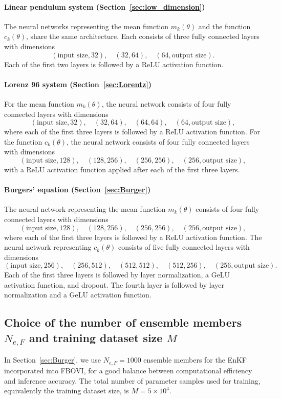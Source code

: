 \documentclass[preprint,3p,times]{elsarticle}
\begin{document}
\paragraph{Linear pendulum system (Section~\ref{sec:low_dimension})}
The neural networks representing the mean function $m_k(\theta)$ and the function $c_k(\theta)$, share the same architecture. Each consists of three fully connected layers with dimensions
\[
(\text{input size}, 32), \quad (32, 64), \quad (64, \text{output size}).
\]
Each of the first two layers is followed by a ReLU activation function.

\paragraph{Lorenz 96 system (Section~\ref{sec:Lorentz})}
For the mean function $m_k(\theta)$, the neural network consists of four fully connected layers with dimensions
\[
(\text{input size}, 32), \quad (32, 64), \quad (64, 64), \quad (64, \text{output size}),
\]
where each of the first three layers is followed by a ReLU activation function. For the function $c_k(\theta)$, the neural network consists of four fully connected layers with dimensions
\[
(\text{input size}, 128), \quad (128, 256), \quad (256, 256), \quad (256, \text{output size}),
\]
with a ReLU activation function applied after each of the first three layers.

\paragraph{Burgers' equation (Section~\ref{sec:Burger})}
The neural network representing the mean function $m_k(\theta)$ consists of four fully connected layers with dimensions
\[
(\text{input size}, 128), \quad (128, 256), \quad (256, 256), \quad (256, \text{output size}),
\]
where each of the first three layers is followed by a ReLU activation function. The neural network representing $c_k(\theta)$ consists of five fully connected layers with dimensions
\[
(\text{input size}, 256), \quad (256, 512), \quad (512, 512), \quad (512, 256), \quad (256, \text{output size}).
\]
Each of the first three layers is followed by layer normalization, a GeLU activation function, and dropout. The fourth layer is followed by layer normalization and a GeLU activation function.

\subsection{Choice of the number of ensemble members $N_{e,F}$ and training dataset size $M$}
In Section~\ref{sec:Burger}, we use $N_{e,F}=1000$ ensemble members for the EnKF incorporated into FBOVI, for a good balance between computational efficiency and inference accuracy. The total number of parameter samples used for training, equivalently the training dataset size, is $M=5\times 10^4$.
\end{document}

